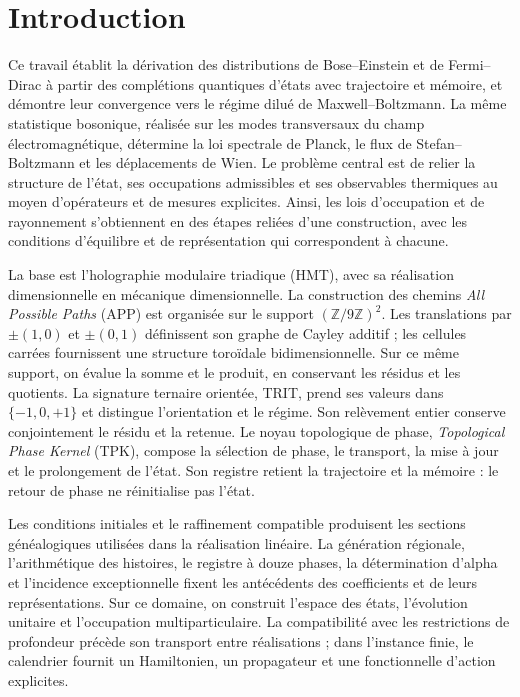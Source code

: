 \section*{Introduction}
{}
\label{v:presentacion}
Ce travail établit la dérivation des distributions de
Bose--Einstein et de Fermi--Dirac à partir des complétions quantiques
d’états avec trajectoire et mémoire, et démontre leur convergence vers le régime
dilué de Maxwell--Boltzmann. La même statistique bosonique, réalisée
sur les modes transversaux du champ électromagnétique, détermine la
loi spectrale de Planck, le flux de Stefan--Boltzmann et les
déplacements de Wien. Le problème central est de relier la structure
de l’état, ses occupations admissibles et ses observables thermiques au moyen
d’opérateurs et de mesures explicites. Ainsi, les lois d’occupation et de
rayonnement s’obtiennent en des étapes reliées d’une construction, avec les
conditions d’équilibre et de représentation qui correspondent à chacune.

La base est l’holographie modulaire triadique (HMT), avec sa réalisation
dimensionnelle en mécanique dimensionnelle. La construction des chemins
\emph{All Possible Paths} (APP) est organisée sur le support
\((\mathbb Z/9\mathbb Z)^2\). Les translations par
\(\pm(1,0)\) et \(\pm(0,1)\) définissent son graphe de Cayley additif ;
les cellules carrées fournissent une structure toroïdale bidimensionnelle.
Sur ce même support, on évalue la somme et le produit, en conservant
les résidus et les quotients. La signature ternaire orientée, TRIT, prend ses valeurs
dans \(\{-1,0,+1\}\) et distingue l’orientation et le régime. Son relèvement
entier conserve conjointement le résidu et la retenue. Le noyau
topologique de phase, \emph{Topological Phase Kernel}
(TPK), compose la sélection de phase, le transport, la mise à jour et le
prolongement de l’état. Son registre retient la trajectoire et la mémoire :
le retour de phase ne réinitialise pas l’état.

Les conditions initiales et le raffinement compatible produisent les
sections généalogiques utilisées dans la réalisation linéaire. La
génération régionale, l’arithmétique des histoires, le registre à douze phases,
la détermination d’alpha et l’incidence exceptionnelle fixent les
antécédents des coefficients et de leurs représentations. Sur ce
domaine, on construit l’espace des états, l’évolution unitaire et
l’occupation multiparticulaire. La compatibilité avec les restrictions de
profondeur précède son transport entre réalisations ; dans l’instance
finie, le calendrier fournit un Hamiltonien, un propagateur et une
fonctionnelle d’action explicites.

